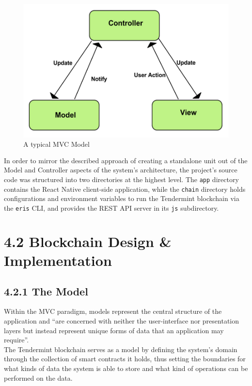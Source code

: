 \documentclass[12pt]{report}
\begin{document}
\begin{figure}[htbp]
\centering
\includegraphics{../diagrams/mvc.png}
\caption{A typical MVC Model\cite{1mvcfigure}}
\end{figure}

In order to mirror the described approach of creating a standalone unit
out of the Model and Controller aspects of the system's architecture,
the project's source code was structured into two directories at the
highest level. The \texttt{app} directory contains the React Native
client-side application, while the \texttt{chain} directory holds
configurations and environment variables to run the Tendermint
blockchain via the \texttt{eris} CLI, and provides the REST API server
in its \texttt{js} subdirectory.

\section{4.2 Blockchain Design \&
Implementation}\label{blockchain-design-implementation}

\subsection{4.2.1 The Model}\label{the-model}

Within the MVC paradigm, models represent the central structure of the
application and ``are concerned with neither the user-interface nor
presentation layers but instead represent unique forms of data that an
application may
require''\cite{osmani2012learning}.\\
The Tendermint blockchain serves as a model by defining the system's
domain through the collection of smart contracts it holds, thus setting
the boundaries for what kinds of data the system is able to store and
what kind of operations can be performed on the data.
\end{document}
